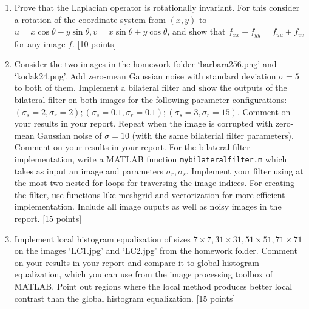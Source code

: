 \documentclass[11pt]{article}
\begin{document}
\begin{enumerate}
\item Prove that the Laplacian operator is rotationally invariant. For this consider a rotation of the coordinate system from $(x,y)$ to $u = x \cos \theta - y \sin \theta, v = x \sin \theta + y \cos \theta$, and show that $f_{xx} + f_{yy} = f_{uu} + f_{vv}$ for any image $f$. \textsf{[10 points]}

\item Consider the two images in the homework folder `barbara256.png' and `kodak24.png'. Add zero-mean Gaussian noise with standard deviation $\sigma = 5$ to both of them. Implement a bilateral filter and show the outputs of the bilateral filter on both images for the following parameter configurations: $(\sigma_s = 2, \sigma_r = 2); (\sigma_s = 0.1, \sigma_r = 0.1); (\sigma_s = 3, \sigma_r = 15)$. Comment on your results in your report. Repeat when the image is corrupted with zero-mean Gaussian noise of $\sigma = 10$ (with the same bilaterial filter parameters). Comment on your results in your report. For the bilateral filter implementation, write a MATLAB function \texttt{mybilateralfilter.m} which takes as input an image and parameters $\sigma_r, \sigma_s$. Implement your filter using at the most two nested for-loops for traversing the image indices. For creating the filter, use functions like meshgrid and vectorization for more efficient implementation. Include all image ouputs as well as noisy images in the report. \textsf{[15 points]}

\item Implement local histogram equalization of sizes $7 \times 7, 31 \times 31, 51 \times 51, 71 \times 71$ on the images `LC1.jpg' and `LC2.jpg' from the homework folder. Comment on your results in your report and compare it to global histogram equalization, which you can use from the image processing toolbox of MATLAB. Point out regions where the local method produces better local contrast than the global histogram equalization. \textsf{[15 points]}

\end{enumerate}
\end{document}
